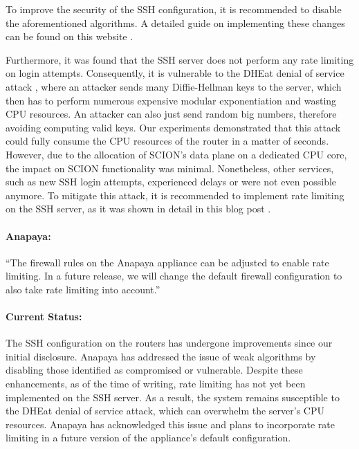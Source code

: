 To improve the security of the SSH configuration, it is recommended to disable the aforementioned algorithms.
A detailed guide on implementing these changes can be found on this website \cite{sshauditHardeningGuides}.


Furthermore, it was found that the SSH server does not perform any rate limiting on login attempts.
Consequently, it is vulnerable to the DHEat denial of service attack \cite{dheatAttack}, where an attacker sends many Diffie-Hellman keys to the server, which then has to perform numerous expensive modular exponentiation and wasting CPU resources.
An attacker can also just send random big numbers, therefore avoiding computing valid keys.
Our experiments demonstrated that this attack could fully consume the CPU resources of the router in a matter of seconds.
However, due to the allocation of SCION's data plane on a dedicated CPU core, the impact on SCION functionality was minimal.
Nonetheless, other services, such as new SSH login attempts, experienced delays or were not even possible anymore.
To mitigate this attack, it is recommended to implement rate limiting on the SSH server, as it was shown in detail in this blog post \cite{dheatAnalysis}.

\begin{boxH}
\paragraph{Anapaya:}
``The firewall rules on the Anapaya appliance can be adjusted to enable rate limiting. In a future release, we will change the default firewall configuration to also take rate limiting into account.''
\end{boxH}
\newpage
\paragraph{Current Status:}
The SSH configuration on the routers has undergone improvements since our initial disclosure.
Anapaya has addressed the issue of weak algorithms by disabling those identified as compromised or vulnerable.
Despite these enhancements, as of the time of writing, rate limiting has not yet been implemented on the SSH server.
As a result, the system remains susceptible to the DHEat denial of service attack, which can overwhelm the server's CPU resources.
Anapaya has acknowledged this issue and plans to incorporate rate limiting in a future version of the appliance's default configuration.


